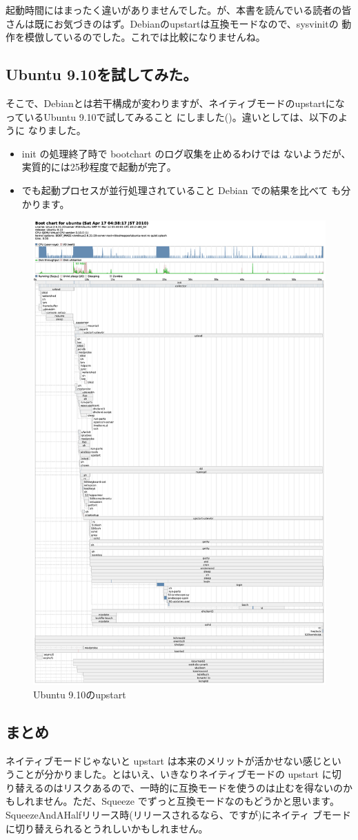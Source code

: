 \documentclass[mingoth,a4paper]{jsarticle}
\begin{document}
起動時間にはまったく違いがありませんでした。が、本書を読んでいる読者の皆
さんは既にお気づきのはず。Debianのupstartは互換モードなので、sysvinitの
動作を模倣しているのでした。これでは比較になりませんね。

\subsection{Ubuntu 9.10を試してみた。}

そこで、Debianとは若干構成が変わりますが、ネイティブモードのupstartになっているUbuntu 9.10で試してみること
にしました()。違いとしては、以下のように
なりました。

\begin{itemize}
 \item init の処理終了時で bootchart のログ収集を止めるわけでは
       ないようだが、実質的には25秒程度で起動が完了。
 \item でも起動プロセスが並行処理されていること Debian での結果を比べて
       も分かります。
\end{itemize}

\begin{figure}[thbp]
\begin{center}
\includegraphics[height=0.6\hsize]{image201004/upstart/ubuntu-karmic-20100417-3.eps}
\caption{Ubuntu 9.10のupstart}
\label{fig:ubuntu-upstart-check}
\end{center}
\end{figure}


\subsection{まとめ}
ネイティブモードじゃないと upstart は本来のメリットが活かせない感じとい
うことが分かりました。とはいえ、いきなりネイティブモードの upstart に切
り替えるのはリスクあるので、一時的に互換モードを使うのは止むを得ないのか
もしれません。ただ、Squeeze でずっと互換モードなのもどうかと思います。
SqueezeAndAHalfリリース時(リリースされるなら、ですが)にネイティ
ブモードに切り替えられるとうれしいかもしれません。
\end{document}
